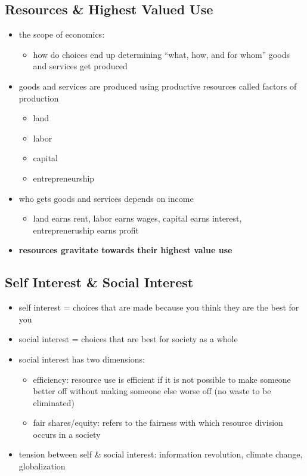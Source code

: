 \documentclass[11pt]{article}
\begin{document}
\subsection{Resources \& Highest Valued Use}
\label{sec:orgcda2348}
\begin{itemize}
\item the scope of economics: 
\begin{itemize}
\item how do choices end up determining ``what, how, and for whom'' goods and services get produced
\end{itemize}
\item goods and services are produced using productive resources called factors of production
\begin{itemize}
\item land
\item labor
\item capital
\item entrepreneurship
\end{itemize}
\item who gets goods and services depends on income
\begin{itemize}
\item land earns rent, labor earns wages, capital earns interest, entrepreneruship earns profit
\end{itemize}
\item \textbf{\textbf{resources gravitate towards their highest value use}}
\end{itemize}
\subsection{Self Interest \& Social Interest}
\label{sec:org4975320}
\begin{itemize}
\item self interest = choices that are made because you think they are the best for you
\item social interest = choices that are best for society as a whole
\item social interest has two dimensions: 
\begin{itemize}
\item efficiency: resource use is efficient if it is not possible to make someone better off without
making someone else worse off (no waste to be eliminated)
\item fair shares/equity: refers to the fairness with which resource division occurs in a society
\end{itemize}
\item tension between self \& social interest: information revolution, climate change, globalization
\end{itemize}
\end{document}
